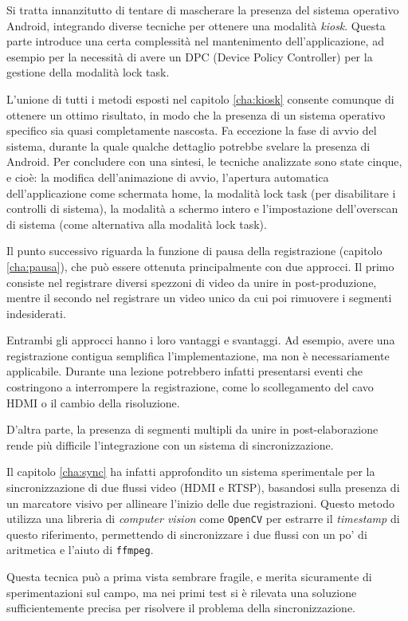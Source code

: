Si tratta innanzitutto di tentare di mascherare la presenza del sistema operativo Android, integrando diverse tecniche per ottenere una modalità \emph{kiosk}. Questa parte introduce una certa complessità nel mantenimento dell'applicazione, ad esempio per la necessità di avere un DPC (Device Policy Controller) per la gestione della modalità lock task.

L'unione di tutti i metodi esposti nel capitolo \ref{cha:kiosk} consente comunque di ottenere un ottimo risultato, in modo che la presenza di un sistema operativo specifico sia quasi completamente nascosta. Fa eccezione la fase di avvio del sistema, durante la quale qualche dettaglio potrebbe svelare la presenza di Android. Per concludere con una sintesi, le tecniche analizzate sono state cinque, e cioè: la modifica dell'animazione di avvio, l'apertura automatica dell'applicazione come schermata home, la modalità lock task (per disabilitare i controlli di sistema), la modalità a schermo intero e l'impostazione dell'overscan di sistema (come alternativa alla modalità lock task).

Il punto successivo riguarda la funzione di pausa della registrazione (capitolo \ref{cha:pausa}), che può essere ottenuta principalmente con due approcci. Il primo consiste nel registrare diversi spezzoni di video da unire in post-produzione, mentre il secondo nel registrare un video unico da cui poi rimuovere i segmenti indesiderati.

Entrambi gli approcci hanno i loro vantaggi e svantaggi. Ad esempio, avere una registrazione contigua semplifica l'implementazione, ma non è necessariamente applicabile. Durante una lezione potrebbero infatti presentarsi eventi che costringono a interrompere la registrazione, come lo scollegamento del cavo HDMI o il cambio della risoluzione.

D'altra parte, la presenza di segmenti multipli da unire in post-elaborazione rende più difficile l'integrazione con un sistema di sincronizzazione.

Il capitolo \ref{cha:sync} ha infatti approfondito un sistema sperimentale per la sincronizzazione di due flussi video (HDMI e RTSP), basandosi sulla presenza di un marcatore visivo per allineare l'inizio delle due registrazioni. Questo metodo utilizza una libreria di \emph{computer vision} come \texttt{OpenCV} per estrarre il \emph{timestamp} di questo riferimento, permettendo di sincronizzare i due flussi con un po' di aritmetica e l'aiuto di \texttt{ffmpeg}.

Questa tecnica può a prima vista sembrare fragile, e merita sicuramente di sperimentazioni sul campo, ma nei primi test si è rilevata una soluzione sufficientemente precisa per risolvere il problema della sincronizzazione.

